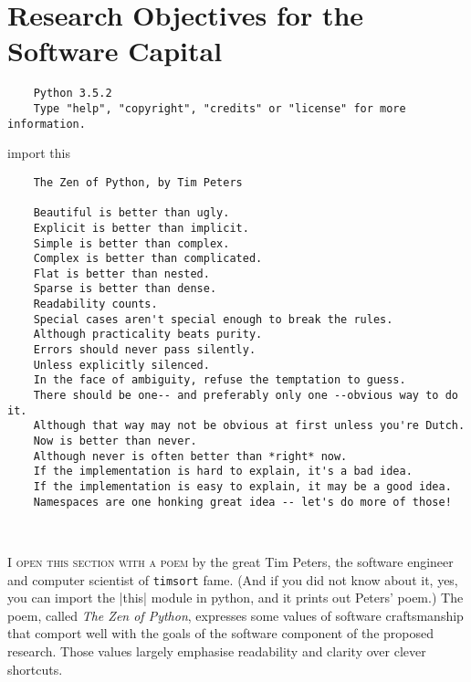 \section{Research Objectives for the Software Capital}%
\label{sec:ObjectivesForSoftwareCapital}


\begin{flushright}
\begin{minipage}{0.85\textwidth}
  \footnotesize
  {\color{git-ltgray}
  \begin{verbatim}
    Python 3.5.2
    Type "help", "copyright", "credits" or "license" for more information.
  \end{verbatim}
  }\null{}\baselineskip
  {\ttfamily
  \noindent {>}{>}{>} \textcolor{git-red}{import} this
  }
  \begin{verbatim}
    The Zen of Python, by Tim Peters

    Beautiful is better than ugly.
    Explicit is better than implicit.
    Simple is better than complex.
    Complex is better than complicated.
    Flat is better than nested.
    Sparse is better than dense.
    Readability counts.
    Special cases aren't special enough to break the rules.
    Although practicality beats purity.
    Errors should never pass silently.
    Unless explicitly silenced.
    In the face of ambiguity, refuse the temptation to guess.
    There should be one-- and preferably only one --obvious way to do it.
    Although that way may not be obvious at first unless you're Dutch.
    Now is better than never.
    Although never is often better than *right* now.
    If the implementation is hard to explain, it's a bad idea.
    If the implementation is easy to explain, it may be a good idea.
    Namespaces are one honking great idea -- let's do more of those!
  \end{verbatim}
\end{minipage}\\
\end{flushright}

\noindent\textsc{I open this section with a poem} by the great Tim Peters, the
software engineer and computer scientist of \texttt{timsort} fame. (And if you did not know about it, yes, you
can import the |this| module in python, and it prints out Peters' poem.) The
poem, called \emph{The Zen of Python}, expresses some values of software
craftsmanship that comport well with the goals of the software component of the
proposed research. Those values largely emphasise readability and clarity over
clever shortcuts.

